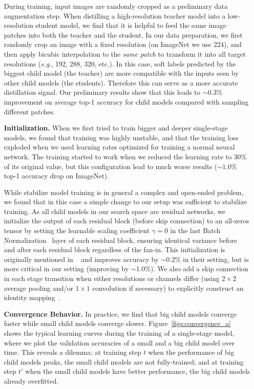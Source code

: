 \documentclass[runningheads]{llncs}
\def\onedot{.}
\def\eg{\emph{e.g}\onedot} \def\Eg{\emph{E.g}\onedot}
\begin{document}
During training, input images are randomly cropped as a preliminary data augmentation step. When distilling a high-resolution teacher model into a low-resolution student model, we find that it is helpful to feed the same image patches into both the teacher and the student. In our data preparation, we first randomly crop an image with a fixed resolution (on ImageNet we use 224), and then apply bicubic interpolation to the \emph{same patch} to transform it into all target resolutions (\eg, 192, 288, 320, etc.). In this case, soft labels predicted by the biggest child model (the teacher) are more compatible with the inputs seen by other child models (the students). Therefore this can serve as a more accurate distillation signal. Our preliminary results show that this leads to \(\sim0.3\%\) improvement on average top-1 accuracy for child models compared with sampling different patches.

\textbf{Initialization.}
When we first tried to train bigger and deeper single-stage models, we found that training was highly unstable, and that the training loss exploded when we used learning rates optimized for training a normal neural network. The training started to work when we reduced the learning rate to 30\% of its original value, but this configuration lead to much worse results (\(\sim 1.0\%\) top-1 accuracy drop on ImageNet).

While stabilize model training is in general a complex and open-ended problem, we found that in this case a simple change to our setup was sufficient to stabilize training. As all child models in our search space are residual networks, we initialize the output of each residual block (before skip connection) to an all-zeros tensor by setting the learnable scaling coefficient \(\gamma = 0\) in the last Batch Normalization~\cite{ioffe2015batch} layer of each residual block, ensuring identical variance before and after each residual block regardless of the fan-in. This initialization is originally mentioned in ~\cite{goyal2017accurate} and improves accuracy by \(\sim 0.2\%\) in their setting, but is more critical in our setting (improving by \(\sim 1.0\%\)). We also add a skip connection in each stage transition when either resolutions or channels differ (using \(2 \times 2\) average pooling and/or \(1 \times 1\) convolution if necessary) to explicitly construct an identity mapping~\cite{he2016identity}.

\textbf{Convergence Behavior.} In practice, we find that big child models converge faster while small child models converge slower. Figure~\ref{figs:convergence_a} shows the typical learning curves during the training of a single-stage model, where we plot the validation accuracies of a small and a big child model over time. This reveals a dilemma: at training step \(t\) when the performance of big child models peaks, the small child models are not fully-trained; and at training step \(t'\) when the small child models have better performance, the big child models already overfitted.
\end{document}
